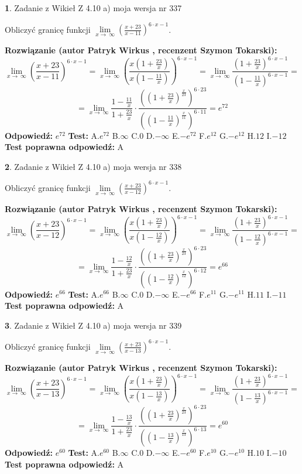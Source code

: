 \documentclass[12pt, a4paper]{article}
\theoremstyle{definition} %
\newtheorem{zad}{}
\newcommand{\zadStart}[1]{\begin{zad}#1\newline}
\newcommand{\zadStop}{\end{zad}}
\newcommand{\rozwStart}[2]{\noindent \textbf{Rozwiązanie (autor #1 , recenzent #2): }\newline}
\newcommand{\rozwStop}{\newline}
\newcommand{\odpStart}{\noindent \textbf{Odpowiedź:}\newline}
\newcommand{\odpStop}{\newline}
\newcommand{\testStart}{\noindent \textbf{Test:}\newline}
\newcommand{\testStop}{\newline}
\newcommand{\kluczStart}{\noindent \textbf{Test poprawna odpowiedź:}\newline}
\newcommand{\kluczStop}{\newline}
\begin{document}
\zadStart{Zadanie z Wikieł Z 4.10 a) moja wersja nr 337}

Obliczyć granicę funkcji  $\lim\limits_{x\to\ \infty}(\frac{x+23}{x-11})^{6\cdot x-1}$.
\zadStop
\rozwStart{Patryk Wirkus}{Szymon Tokarski}
$$\lim\limits_{x\to\ \infty}(\frac{x+23}{x-11})^{6\cdot x-1} = \lim\limits_{x\to\ \infty}(\frac{x(1+\frac{23}{x})}{x(1-\frac{11}{x})})^{6\cdot x-1}=\lim\limits_{x\to\ \infty}\frac{(1+\frac{23}{x})^{6\cdot x-1}}{(1-\frac{11}{x})^{6\cdot x-1}}=$$
$$=\lim\limits_{x\to\ \infty}\frac{1-\frac{11}{x}}{1+\frac{23}{x}}\cdot\frac{((1+\frac{23}{x})^{\frac{x}{23}})^{6\cdot23}}{((1-\frac{11}{x})^{\frac{x}{11}})^{6\cdot11}}=e^{72}$$
\rozwStop
\odpStart
$e^{72}$
\odpStop
\testStart
A.$e^{72}$ B.$\infty$ C.$0$ D.$-\infty$ E.$-e^{72}$
F.$e^{12}$ G.$-e^{12}$
H.$12$
I.$-12$
\testStop
\kluczStart
A
\kluczStop



\zadStart{Zadanie z Wikieł Z 4.10 a) moja wersja nr 338}

Obliczyć granicę funkcji  $\lim\limits_{x\to\ \infty}(\frac{x+23}{x-12})^{6\cdot x-1}$.
\zadStop
\rozwStart{Patryk Wirkus}{Szymon Tokarski}
$$\lim\limits_{x\to\ \infty}(\frac{x+23}{x-12})^{6\cdot x-1} = \lim\limits_{x\to\ \infty}(\frac{x(1+\frac{23}{x})}{x(1-\frac{12}{x})})^{6\cdot x-1}=\lim\limits_{x\to\ \infty}\frac{(1+\frac{23}{x})^{6\cdot x-1}}{(1-\frac{12}{x})^{6\cdot x-1}}=$$
$$=\lim\limits_{x\to\ \infty}\frac{1-\frac{12}{x}}{1+\frac{23}{x}}\cdot\frac{((1+\frac{23}{x})^{\frac{x}{23}})^{6\cdot23}}{((1-\frac{12}{x})^{\frac{x}{12}})^{6\cdot12}}=e^{66}$$
\rozwStop
\odpStart
$e^{66}$
\odpStop
\testStart
A.$e^{66}$ B.$\infty$ C.$0$ D.$-\infty$ E.$-e^{66}$
F.$e^{11}$ G.$-e^{11}$
H.$11$
I.$-11$
\testStop
\kluczStart
A
\kluczStop



\zadStart{Zadanie z Wikieł Z 4.10 a) moja wersja nr 339}

Obliczyć granicę funkcji  $\lim\limits_{x\to\ \infty}(\frac{x+23}{x-13})^{6\cdot x-1}$.
\zadStop
\rozwStart{Patryk Wirkus}{Szymon Tokarski}
$$\lim\limits_{x\to\ \infty}(\frac{x+23}{x-13})^{6\cdot x-1} = \lim\limits_{x\to\ \infty}(\frac{x(1+\frac{23}{x})}{x(1-\frac{13}{x})})^{6\cdot x-1}=\lim\limits_{x\to\ \infty}\frac{(1+\frac{23}{x})^{6\cdot x-1}}{(1-\frac{13}{x})^{6\cdot x-1}}=$$
$$=\lim\limits_{x\to\ \infty}\frac{1-\frac{13}{x}}{1+\frac{23}{x}}\cdot\frac{((1+\frac{23}{x})^{\frac{x}{23}})^{6\cdot23}}{((1-\frac{13}{x})^{\frac{x}{13}})^{6\cdot13}}=e^{60}$$
\rozwStop
\odpStart
$e^{60}$
\odpStop
\testStart
A.$e^{60}$ B.$\infty$ C.$0$ D.$-\infty$ E.$-e^{60}$
F.$e^{10}$ G.$-e^{10}$
H.$10$
I.$-10$
\testStop
\kluczStart
A
\kluczStop
\end{document}
